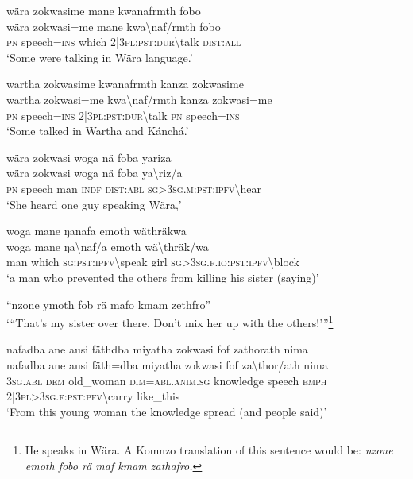 \ea\label{ex:4:a1749}
wära zokwasime mane kwanafrmth fobo\\
\gll wära	zokwasi=me	mane	kwa{\textbackslash}naf/rmth	fobo\\
     \textsc{pn}	speech=\textsc{ins}	which	2|3\textsc{pl}:\textsc{pst}:\textsc{dur}{\textbackslash}talk	\textsc{dist}:\textsc{all}\\
\glt `Some were talking in Wära language.'
\z

\ea\label{ex:4:a1750}
wartha zokwasime kwanafrmth kanza zokwasime\\
\gll wartha	zokwasi=me	kwa{\textbackslash}naf/rmth	kanza	zokwasi=me\\
     \textsc{pn}	speech=\textsc{ins}	2|3\textsc{pl}:\textsc{pst}:\textsc{dur}{\textbackslash}talk	\textsc{pn}	speech=\textsc{ins}\\
\glt `Some talked in Wartha and Kánchá.'
\z

\ea\label{ex:4:a1751}
wära zokwasi woga nä foba yariza\\
\gll wära	zokwasi	woga	nä	foba	ya{\textbackslash}riz/a\\
     \textsc{pn}	speech	man	\textsc{indf}	\textsc{dist}:\textsc{abl}	\textsc{sg}>3\textsc{sg}.\textsc{m}:\textsc{pst}:\textsc{ipfv}{\textbackslash}hear\\
\glt `She heard one guy speaking Wära,'
\z

\ea\label{ex:4:a1752}
woga mane ŋanafa emoth wäthräkwa\\
\gll woga	mane	ŋa{\textbackslash}naf/a	emoth	wä{\textbackslash}thräk/wa\\
     man	which	\textsc{sg}:\textsc{pst}:\textsc{ipfv}{\textbackslash}speak	girl	\textsc{sg}>3\textsc{sg}.\textsc{f}.\textsc{io}:\textsc{pst}:\textsc{ipfv}{\textbackslash}block\\
\glt `a man who prevented the others from killing his sister (saying)'
\z

\ea\label{ex:4:a1753}
``nzone ymoth fob rä mafo kmam zethfro''\\
\glt `{``}That's my sister over there. Don't mix her up with the others!'''\footnote{He speaks in Wära. A Komnzo translation of this sentence would be: \textit{nzone emoth fobo rä maf kmam zathafro.}}
\z

\newpage
\ea\label{ex:4:a1754}
nafadba ane ausi fäthdba miyatha zokwasi fof zathorath nima\\
\gll nafadba	ane	ausi	fäth=dba	miyatha	zokwasi	fof	za{\textbackslash}thor/ath	nima\\
     3\textsc{sg}.\textsc{abl}	\textsc{dem}	old\_woman	\textsc{dim}=\textsc{abl}.\textsc{anim}.\textsc{sg}	knowledge	speech	\textsc{emph}	2|3\textsc{pl}>3\textsc{sg}.\textsc{f}:\textsc{pst}:\textsc{pfv}{\textbackslash}carry	like\_this\\
\glt `From this young woman the knowledge spread (and people said)'
\z

